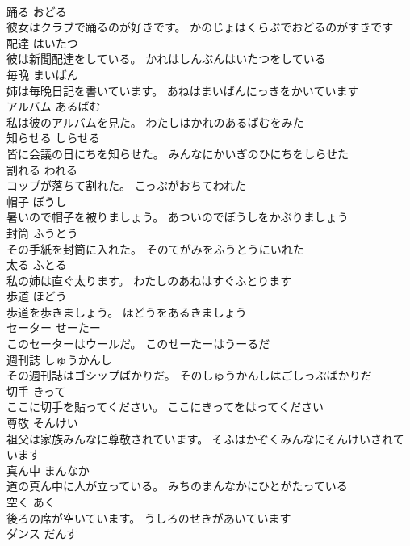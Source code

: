 \documentclass[8pt]{extreport}
\begin{document}
\begin{CJK}{UTF8}{min}
\\	踊る	おどる	
\\	彼女はクラブで踊るのが好きです。	かのじょはくらぶでおどるのがすきです	
\\	配達	はいたつ	
\\	彼は新聞配達をしている。	かれはしんぶんはいたつをしている	
\\	毎晩	まいばん	
\\	姉は毎晩日記を書いています。	あねはまいばんにっきをかいています	
\\	アルバム	あるばむ	
\\	私は彼のアルバムを見た。	わたしはかれのあるばむをみた	
\\	知らせる	しらせる	
\\	皆に会議の日にちを知らせた。	みんなにかいぎのひにちをしらせた	
\\	割れる	われる	
\\	コップが落ちて割れた。	こっぷがおちてわれた	
\\	帽子	ぼうし	
\\	暑いので帽子を被りましょう。	あついのでぼうしをかぶりましょう	
\\	封筒	ふうとう	
\\	その手紙を封筒に入れた。	そのてがみをふうとうにいれた	
\\	太る	ふとる	
\\	私の姉は直ぐ太ります。	わたしのあねはすぐふとります	
\\	歩道	ほどう	
\\	歩道を歩きましょう。	ほどうをあるきましょう	
\\	セーター	せーたー	
\\	このセーターはウールだ。	このせーたーはうーるだ	
\\	週刊誌	しゅうかんし	
\\	その週刊誌はゴシップばかりだ。	そのしゅうかんしはごしっぷばかりだ	
\\	切手	きって	
\\	ここに切手を貼ってください。	ここにきってをはってください	
\\	尊敬	そんけい	
\\	祖父は家族みんなに尊敬されています。	そふはかぞくみんなにそんけいされています	
\\	真ん中	まんなか	
\\	道の真ん中に人が立っている。	みちのまんなかにひとがたっている	
\\	空く	あく	
\\	後ろの席が空いています。	うしろのせきがあいています	
\\	ダンス	だんす	

\end{CJK}
\end{document}
